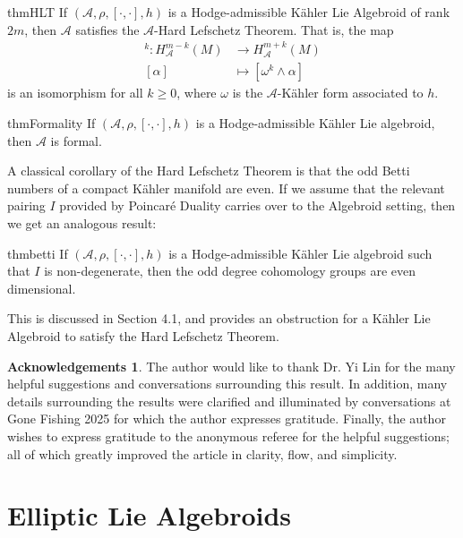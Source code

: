 \documentclass{amsart}
\newcommand{\ra}{\rightarrow}
\theoremstyle{definition}
\newtheorem*{Acknow}{Acknowledgements}
\newcommand{\A}{\mathcal{A}}
\theoremstyle{definition}
\begin{document}
\begin{restatable}{thm}{HLT}
     If $(\A,\rho ,[\cdot, \cdot],h)$ is a Hodge-admissible K\"ahler Lie Algebroid of rank $2m$, then $\A$ satisfies the $\A$-Hard Lefschetz Theorem. That is, the map
    \begin{align*}
        [L]^k:H^{m-k}_\A(M) &\ra H_\A^{m+k}(M) \\
        [\alpha] &\mapsto [\omega^k\wedge \alpha]
    \end{align*}
    is an isomorphism for all $k \geq 0$, where $\omega$ is the $\A$-Kähler form associated to $h$.
\end{restatable}

\begin{restatable}{thm}{Formality}
    If $(\A,\rho ,[\cdot, \cdot],h)$ is a Hodge-admissible K\"ahler Lie algebroid, then $\A$ is formal.
\end{restatable}
 A classical corollary of the Hard Lefschetz Theorem is that the odd Betti numbers of a compact Kähler manifold are even. If we assume that the relevant pairing $I$ provided by Poincar\'e Duality carries over to the Algebroid setting, then we get an analogous result:
\begin{restatable}{thm}{betti}
     If $(\A,\rho ,[\cdot, \cdot],h)$ is a Hodge-admissible K\"ahler Lie algebroid such that $I$ is non-degenerate, then the odd degree cohomology groups are even dimensional.
\end{restatable}
This is discussed in Section 4.1, and provides an obstruction for a Kähler Lie Algebroid to satisfy the Hard Lefschetz Theorem.
\begin{Acknow}
    The author would like to thank Dr. Yi Lin for the many helpful suggestions and conversations surrounding this result. In addition, many details surrounding the results were clarified and illuminated by conversations at Gone Fishing 2025 for which the author expresses gratitude. Finally, the author wishes to express gratitude to the anonymous  referee for the helpful suggestions; all of which greatly improved the article in clarity, flow, and simplicity.
\end{Acknow}

\section{Elliptic Lie Algebroids}
\end{document}

